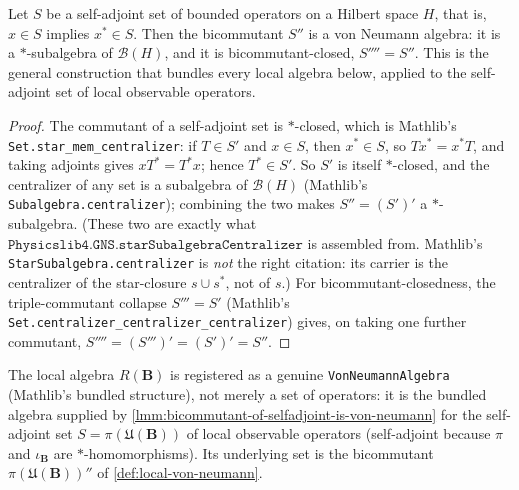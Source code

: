 \begin{lemma}
    \label{lmm:bicommutant-of-selfadjoint-is-von-neumann}
    \leanok
    Let $S$ be a self-adjoint set of bounded operators on a Hilbert space $H$, that is, $x \in S$ implies $x^* \in S$. Then the bicommutant $S''$ is a von Neumann algebra: it is a $*$-subalgebra of $\mathcal{B}(H)$, and it is bicommutant-closed, $S'''' = S''$. This is the general construction that bundles every local algebra below, applied to the self-adjoint set of local observable operators.
\end{lemma}
\begin{proof}
    \leanok
    The commutant of a self-adjoint set is $*$-closed, which is Mathlib's \texttt{Set.star\_mem\_centralizer}: if $T \in S'$ and $x \in S$, then $x^* \in S$, so $T x^* = x^* T$, and taking adjoints gives $x T^* = T^* x$; hence $T^* \in S'$. So $S'$ is itself $*$-closed, and the centralizer of any set is a subalgebra of $\mathcal{B}(H)$ (Mathlib's \texttt{Subalgebra.centralizer}); combining the two makes $S'' = (S')'$ a $*$-subalgebra. (These two are exactly what $\mathtt{Physicslib4.GNS.starSubalgebraCentralizer}$ is assembled from. Mathlib's \texttt{StarSubalgebra.centralizer} is \emph{not} the right citation: its carrier is the centralizer of the star-closure $s \cup s^*$, not of $s$.) For bicommutant-closedness, the triple-commutant collapse $S''' = S'$ (Mathlib's \texttt{Set.centralizer\_centralizer\_centralizer}) gives, on taking one further commutant, $S'''' = (S''')' = (S')' = S''$.
\end{proof}

\begin{definition}
    \label{def:local-von-neumann-algebra}
    \leanok
    The local algebra $R(\mathbf{B})$ is registered as a genuine \texttt{VonNeumannAlgebra} (Mathlib's bundled structure), not merely a set of operators: it is the bundled algebra supplied by \ref{lmm:bicommutant-of-selfadjoint-is-von-neumann} for the self-adjoint set $S = \pi(\mathfrak{U}(\mathbf{B}))$ of local observable operators (self-adjoint because $\pi$ and $\iota_{\mathbf{B}}$ are $*$-homomorphisms). Its underlying set is the bicommutant $\pi(\mathfrak{U}(\mathbf{B}))''$ of \ref{def:local-von-neumann}.
\end{definition}

